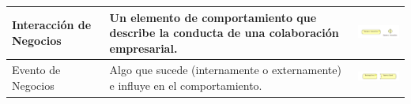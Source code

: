 \begin{table}[H]
\begin{tabular}{| m{3cm} | m{7cm} | m{3.8cm} |}
		Interacción de Negocios  & Un elemento de comportamiento que describe la conducta de una colaboración empresarial.                                                                                             
		&\vspace{1.52mm} \includegraphics[width=40mm,height=10mm]{imgs/conceptos/negocio/Business_interaction.pdf}            \\ \hline
		
		Evento de Negocios       & Algo que sucede (internamente o externamente) e influye en el  comportamiento.                                                                                                       
		&\vspace{1.52mm} \includegraphics[width=40mm, height=10mm]{imgs/conceptos/negocio/Business_event.pdf}  \\ \hline
		
	\end{tabular}
\end{table}

